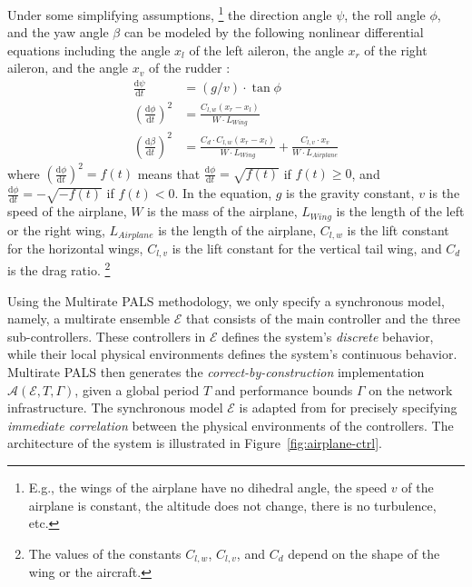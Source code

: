 \documentclass{sig-alternate}
\begin{document}
Under some simplifying assumptions,%
\footnote{E.g., the wings of the airplane have no dihedral angle, 
the speed $v$ of the airplane is constant, 
the altitude does not change, there is no turbulence, etc.}
the direction angle $\psi$, the roll angle $\phi$, and the yaw angle $\beta$
can be modeled by the following nonlinear differential equations 
including 
the angle $x_l$ of the left aileron,
the angle $x_r$ of the right aileron, and 
the angle $x_v$ of the rudder
\cite{ftscs-journal}:
%
\begin{align}
\frac{\mathrm{d}\psi}{\mathrm{d}t} &= (g / v) \cdot \tan \phi
\label{eq:dir}
\\
(\frac{\mathrm{d}\phi}{\mathrm{d}t})^2 &=
\frac{C_{l,w} (x_r - x_l)}{W \cdot L_\mathit{Wing}}
\label{eq:roll}
\\
(\frac{\mathrm{d}\beta}{\mathrm{d}t})^2 &=
\frac{C_d \cdot C_{l,w}  ( x_r -  x_l)}{W \cdot L_\mathit{Wing}}
 + \frac{C_{l,v} \cdot x_v}{W \cdot L_\mathit{Airplane}}
 \label{eq:yaw}
\end{align}
%
where $(\frac{\mathrm{d}\phi}{\mathrm{d}t})^2 = f(t)$
means that 
$\frac{\mathrm{d}\phi}{\mathrm{d}t} = \sqrt{f(t)}$ if $f(t) \geq 0$,
and
$\frac{\mathrm{d}\phi}{\mathrm{d}t} = - \sqrt{- f(t)}$ if $f(t) < 0$.
In the equation, $g$ is the gravity constant, $v$ is the speed of the airplane,
$W$ is the mass of the airplane, 
 $L_\mathit{Wing}$ is the length of the left or the right wing,
 $L_\mathit{Airplane}$ is the length of the airplane,
 $C_{l,w}$ is the lift constant for the horizontal wings,
 $C_{l,v}$ is the lift constant for the vertical tail wing,
 and  $C_d$ is the drag ratio.%
 \footnote{The values of the constants  $C_{l,w}$,  $C_{l,v}$, and $C_d$
 depend on the shape of the wing or the aircraft.}

 




Using the Multirate PALS methodology,
we only specify  a synchronous model,
namely,  a multirate ensemble $\mathcal{E}$ that consists of 
the main controller and the three sub-controllers.
These controllers in $\mathcal{E}$ defines 
the system's \emph{discrete} behavior,
while their local physical environments
defines the system's continuous behavior.
%
Multirate PALS then generates
the \emph{correct-by-construction}   
implementation  
$\mathcal{A}(\mathcal{E}, T, \Gamma)$,
given a global period $T$ and performance bounds 
$\Gamma$ on the network infrastructure.
%
The synchronous model $\mathcal{E}$ %
is adapted from \cite{ftscs-journal} 
for precisely specifying \emph{immediate correlation}
between the physical environments of the controllers.
%
The architecture of the system is illustrated in Figure~\ref{fig:airplane-ctrl}.
\end{document}
